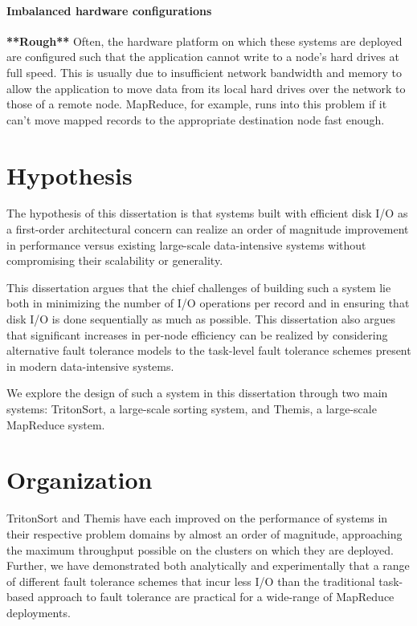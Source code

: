 \paragraph{Imbalanced hardware configurations} \textbf{**Rough**} Often, the hardware platform on
which these systems are deployed are configured such that the application
cannot write to a node's hard drives at full speed. This is usually due to
insufficient network bandwidth and memory to allow the application to move data
from its local hard drives over the network to those of a remote node.
MapReduce, for example, runs into this problem if it can't move mapped records
to the appropriate destination node fast enough.

\section{Hypothesis}

The hypothesis of this dissertation is that systems built with efficient disk
I/O as a first-order architectural concern can realize an order of magnitude
improvement in performance versus existing large-scale data-intensive systems
without compromising their scalability or generality.

This dissertation argues that the chief challenges of building such a system
lie both in minimizing the number of I/O operations per record and in ensuring
that disk I/O is done sequentially as much as possible. This dissertation also
argues that significant increases in per-node efficiency can be realized by
considering alternative fault tolerance models to the task-level fault
tolerance schemes present in modern data-intensive systems.

We explore the design of such a system in this dissertation through two main
systems: TritonSort, a large-scale sorting system, and Themis, a large-scale
MapReduce system.

\section{Organization}

TritonSort and Themis have each improved on the performance of systems in their
respective problem domains by almost an order of magnitude, approaching the
maximum throughput possible on the clusters on which they are
deployed. Further, we have demonstrated both analytically and experimentally
that a range of different fault tolerance schemes that incur less I/O than
the traditional task-based approach to fault tolerance are practical for a
wide-range of MapReduce deployments.


